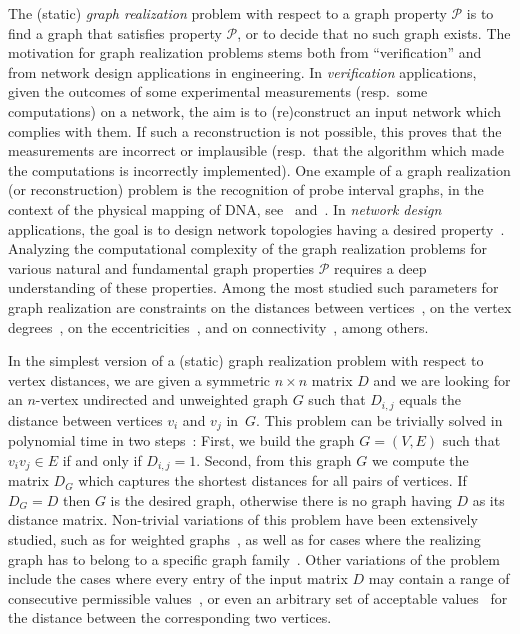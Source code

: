 \documentclass[a4paper,UKenglish,cleveref, autoref, thm-restate, anonymous]{lipics-v2021}
\begin{document}
The (static) \emph{graph realization} problem with respect to a graph property $\mathcal{P}$ is to find a graph that satisfies property $\mathcal{P}$, or to decide that no such graph exists. 
The motivation for graph realization problems stems both from ``verification'' and from network design applications in engineering. 
In \emph{verification} applications, given the outcomes of some experimental measurements (resp.~some computations) on a network, 
the aim is to (re)construct an input network which complies with them. 
If such a reconstruction is not possible, this proves that the measurements are incorrect or implausible (resp.~that the algorithm which made the computations is incorrectly implemented). 
One example of a graph realization (or reconstruction) problem is the recognition of probe interval graphs, in the context of the physical mapping of DNA, see~\cite{McMorris98,McConnellS02} and~\cite[Chapter 4]{GolumbicTrenk04}.
In \emph{network design} applications, the goal is to design network topologies having a desired property~\cite{augustine2022distributed,grotschel1995design}.
Analyzing the computational complexity of the graph realization problems for various natural and fundamental graph properties $\mathcal{P}$ requires a deep understanding of these properties.
Among the most studied such parameters for graph realization 
are constraints on the distances between vertices~\cite{barNoy2022GraphRealization,barNoy2021composed,hakimi1965distance,chung2001distance,bixby1988almost,culberson1989fast}, 
on the vertex degrees~\cite{GolovachM17,gomory1961multi,hakimi1962realizability,Bar-NoyCPR20,erdos1960graphs}, 
on the eccentricities~\cite{barNoy2020efficiently,hell2009linear,behzad1976eccentric,lesniak1975eccentric}, and on connectivity~\cite{fulkerson1960zero,frank1992augmenting,chen1966realization,frank1994connectivity,frank1970connectivity,gomory1961multi}, among others. 


In the simplest version of a (static) graph realization problem with respect to vertex distances, 
we are given a symmetric $n \times n$ matrix $D$ and we are looking for an $n$-vertex undirected and unweighted graph $G$ such that $D_{i,j}$ equals the distance between vertices $v_i$ and $v_j$ in~$G$. This problem can be trivially solved in polynomial time in two steps~\cite{hakimi1965distance}: First, we build the graph $G=(V,E)$ such that $v_i v_j \in E$ if and only if $D_{i,j}=1$. Second, from this graph $G$ we compute the matrix $D_G$ which captures the shortest distances for all pairs of vertices. If $D_G = D$ then $G$ is the desired graph, otherwise there is no graph having $D$ as its distance matrix. 
Non-trivial variations of this problem have been extensively studied, such as for weighted graphs~\cite{hakimi1965distance,Patrinos-Hakimi-72}, as well as for cases where the realizing graph has to belong to a specific graph family~\cite{hakimi1965distance, barNoy2021composed}. Other variations of the problem include the cases where every entry of the input matrix $D$ may contain a range of consecutive permissible values~\cite{barNoy2021composed,Rubei16,Tamura93}, or even an arbitrary set of acceptable values~\cite{barNoy2022GraphRealization} for the distance between the corresponding two vertices. 
\end{document}
